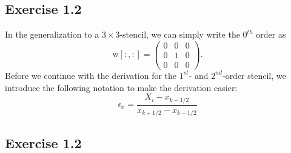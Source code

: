 \documentclass{scrartcl}
\begin{document}
\subsection*{Exercise 1.2}
In the generalization to a \( 3 \times 3 \)-stencil, we can simply write the \(0^{th}\) order as 
\begin{equation}
	\text{w}[:,:] = \begin{pmatrix}
	0 & 0 & 0 \\
	0 & 1 & 0 \\
	0 & 0 & 0
	\end{pmatrix}.
\end{equation}
Before we continue with the derivation for the \( 1^{st} \)- and \( 2^{nd} \)-order stencil, we introduce the following notation to make the derivation easier:
\begin{equation}
	\epsilon_x = \dfrac{X_i - x_{k-1/2}}{x_{k+1/2} - x_{k-1/2}}
\end{equation}

\subsection*{Exercise 1.2}
\end{document}
